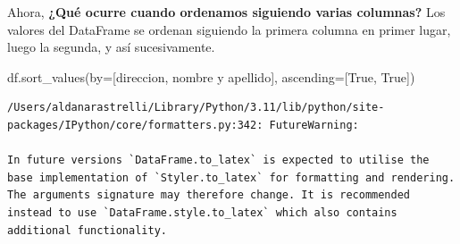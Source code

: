 \documentclass[
  letterpaper,
  DIV=11,
  numbers=noendperiod]{scrreprt}
\newenvironment{Shaded}{\begin{snugshade}}{\end{snugshade}}
\newcommand{\NormalTok}[1]{\textcolor[rgb]{0.00,0.23,0.31}{#1}}
\newcommand{\OperatorTok}[1]{\textcolor[rgb]{0.37,0.37,0.37}{#1}}
\newcommand{\StringTok}[1]{\textcolor[rgb]{0.13,0.47,0.30}{#1}}
\newcommand{\VariableTok}[1]{\textcolor[rgb]{0.07,0.07,0.07}{#1}}
\begin{document}
Ahora, \textbf{¿Qué ocurre cuando ordenamos siguiendo varias columnas?}
Los valores del DataFrame se ordenan siguiendo la primera columna en
primer lugar, luego la segunda, y así sucesivamente.

\begin{Shaded}
\begin{Highlighting}[]
\NormalTok{df.sort\_values(by}\OperatorTok{=}\NormalTok{[}\StringTok{\textquotesingle{}direccion\textquotesingle{}}\NormalTok{, }\StringTok{\textquotesingle{}nombre y apellido\textquotesingle{}}\NormalTok{], ascending}\OperatorTok{=}\NormalTok{[}\VariableTok{True}\NormalTok{, }\VariableTok{True}\NormalTok{])}
\end{Highlighting}
\end{Shaded}

\begin{verbatim}
/Users/aldanarastrelli/Library/Python/3.11/lib/python/site-packages/IPython/core/formatters.py:342: FutureWarning:

In future versions `DataFrame.to_latex` is expected to utilise the base implementation of `Styler.to_latex` for formatting and rendering. The arguments signature may therefore change. It is recommended instead to use `DataFrame.style.to_latex` which also contains additional functionality.
\end{verbatim}
\end{document}
